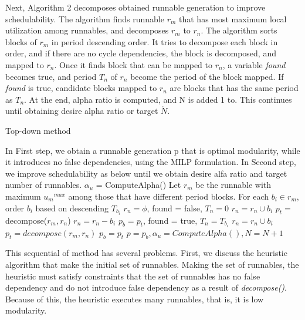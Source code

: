 \documentclass[conference,compsoc]{IEEEtran}
\begin{document}
Next, Algorithm 2 decomposes obtained runnable generation to improve schedulability.
The algorithm finds runnable $r_m$ that has most maximum local utilization among runnables, and decomposes $r_m$ to $r_n$.
The algorithm sorts blocks of $r_m$ in period descending order.
It tries to decompose each block in order, and if there are no cycle dependencies, the block is decomposed, and mapped to $r_n$.
Once it finds block that can be mapped to $r_n$, a variable {\it found} becomes true, and period $T_n$ of $r_n$ become the period of the block mapped.
If {\it found} is true, candidate blocks mapped to $r_n$ are blocks that has the same period as $T_n$.
At the end, alpha ratio is computed, and N is added 1 to.
This continues until obtaining desire alpha ratio or target $\acute{N}$.


\begin{algorithm}                      
\caption{Top-down method}         
\label{alg2}                        
  
\begin{algorithmic}[1]
\STATE In First step, we obtain a runnable generation p that is optimal modularity, while it introduces no false dependencies, using the MILP formulation.
\STATE In Second step, we improve schedulability as below until we obtain desire alfa ratio and target number of runnables.
\STATE $\alpha_u$ = ComputeAlpha()
	\STATE Let $r_m$ be the runnable with maximum $u{_m}^{max}$ among those that have different period blocks.
	\STATE For each $b_i \in r_m$, order $b_i$ based on descending $T_{b_i}$
	\STATE $r_n = \phi$, found = false, $T_n = 0$
			\STATE $r_n = r_n \cup b_i$
			\STATE $p_t = $ decompose($r_m,r_n$)
				\STATE $r_n = r_n - b_i$
			\ELSE 
			\STATE $p_b = p_t$, found = true, $T_n = T_{b_i}$
			\ENDIF
		\ELSE
				\STATE $r_n = r_n \cup b_i$
				\STATE $p_t = decompose(r_m,r_n)$
			\ELSE
				\STATE $p_b = p_t$
			\ENDIF
		\ENDIF
	\ENDFOR
	\STATE $p = p_b, \alpha_u = ComputeAlpha(), N = N + 1$
\ENDWHILE
\end{algorithmic}
\end{algorithm}

 This sequential of method has several problems.
First, we discuss the heuristic algorithm that make the initial set of runnables.
Making the set of runnables, the heuristic must satisfy constraints that the set of runnables has no false dependency and do not introduce false dependency as a result of {\it decompose()}.
Because of this, the heuristic executes many runnables, that is, it is low modularity.
\end{document}
